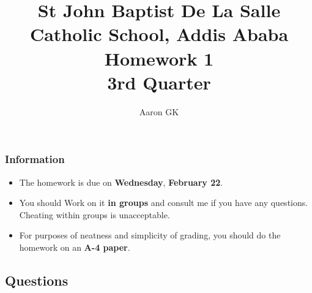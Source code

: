 \documentclass[9pt,addpoints]{exam}
\author{Aaron GK}
\begin{document}
	\title{St John Baptist De La Salle Catholic School, Addis Ababa\\
		\large Homework 1 \\
		3rd Quarter}
	\maketitle
	\begin{center}
		\subsubsection*{Information}
		\begin{itemize}
			\item The homework is due on \textbf{Wednesday}, \textbf{February 22}.
			\item You should Work on it \textbf{in groups} and consult me if you have any questions. Cheating within groups is unacceptable.
			\item For purposes of neatness and simplicity of grading, you should do the homework on an \textbf{A-4 paper}.
		\end{itemize}
	\end{center}
	\begin{center}
		\subsection*{Questions}
	\end{center}
\end{document}

